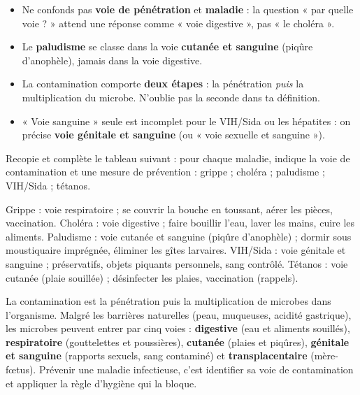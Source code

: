 \documentclass[11pt]{article}
\begin{document}
\begin{attention}
\begin{itemize}
\item Ne confonds pas \textbf{voie de pénétration} et \textbf{maladie} : la question « par quelle voie ? » attend une réponse comme « voie digestive », pas « le choléra ».
\item Le \textbf{paludisme} se classe dans la voie \textbf{cutanée et sanguine} (piqûre d'anophèle), jamais dans la voie digestive.
\item La contamination comporte \textbf{deux étapes} : la pénétration \emph{puis} la multiplication du microbe. N'oublie pas la seconde dans ta définition.
\item « Voie sanguine » seule est incomplet pour le VIH/Sida ou les hépatites : on précise \textbf{voie génitale et sanguine} (ou « voie sexuelle et sanguine »).
\end{itemize}
\end{attention}

\begin{exercice}
Recopie et complète le tableau suivant : pour chaque maladie, indique la voie de contamination et une mesure de prévention : grippe ; choléra ; paludisme ; VIH/Sida ; tétanos.
\end{exercice}

\begin{corrige}[Exercice]
Grippe : voie respiratoire ; se couvrir la bouche en toussant, aérer les pièces, vaccination. Choléra : voie digestive ; faire bouillir l'eau, laver les mains, cuire les aliments. Paludisme : voie cutanée et sanguine (piqûre d'anophèle) ; dormir sous moustiquaire imprégnée, éliminer les gîtes larvaires. VIH/Sida : voie génitale et sanguine ; préservatifs, objets piquants personnels, sang contrôlé. Tétanos : voie cutanée (plaie souillée) ; désinfecter les plaies, vaccination (rappels).
\end{corrige}

\begin{aretenir}
La contamination est la pénétration puis la multiplication de microbes dans l'organisme. Malgré les barrières naturelles (peau, muqueuses, acidité gastrique), les microbes peuvent entrer par cinq voies : \textbf{digestive} (eau et aliments souillés), \textbf{respiratoire} (gouttelettes et poussières), \textbf{cutanée} (plaies et piqûres), \textbf{génitale et sanguine} (rapports sexuels, sang contaminé) et \textbf{transplacentaire} (mère-fœtus). Prévenir une maladie infectieuse, c'est identifier sa voie de contamination et appliquer la règle d'hygiène qui la bloque.
\end{aretenir}
\end{document}
